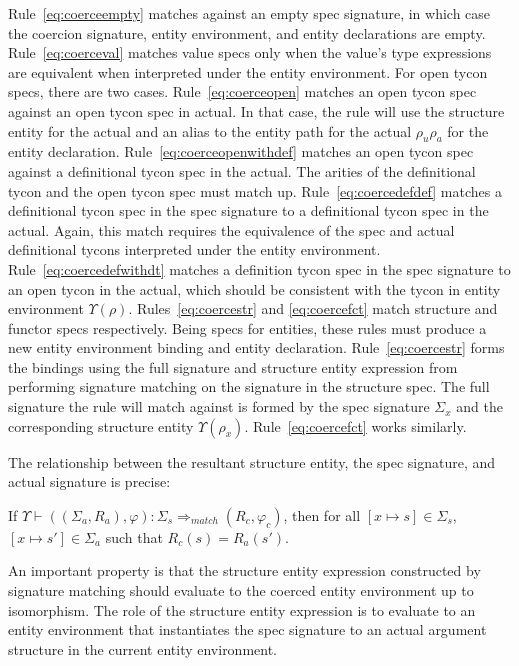 \documentclass[9pt,nocopyrightspace, fleqn]{sigplanconf}
\begin{document}
Rule~\ref{eq:coerceempty} matches against an empty spec signature, in
which case the coercion signature, entity environment, and entity
declarations are empty. Rule~\ref{eq:coerceval} matches value specs
only when the value's type expressions are equivalent when interpreted
under the entity environment. For open tycon specs, there are two
cases. Rule~\ref{eq:coerceopen} matches an open tycon spec against an
open tycon spec in actual. In that case, the rule will use the
structure entity for the actual and an alias to the entity path for
the actual $\rho_u\rho_a$ for the entity
declaration. Rule~\ref{eq:coerceopenwithdef} matches an open tycon
spec against a definitional tycon spec in the actual. The arities of
the definitional tycon and the open tycon spec must match
up. Rule~\ref{eq:coercedefdef} matches a definitional tycon spec in
the spec signature to a definitional tycon spec in the actual. Again,
this match requires the equivalence of the spec and actual
definitional tycons interpreted under the entity
environment. Rule~\ref{eq:coercedefwithdt} matches a definition tycon
spec in the spec signature to an open tycon in the actual, which should be consistent with the tycon in entity environment $\Upsilon(\rho)$. Rules~\ref{eq:coercestr} and \ref{eq:coercefct} match structure and functor specs respectively. Being specs for entities, these rules must produce a new entity environment binding and entity declaration. Rule~\ref{eq:coercestr} forms the bindings using the full signature and structure entity expression from performing signature matching on the signature in the structure spec. The full signature the rule will match against is formed by the spec signature $\Sigma_x$ and the corresponding structure entity $\Upsilon(\rho_x)$. Rule~\ref{eq:coercefct} works similarly. 

The relationship between the resultant structure entity, the spec
signature, and actual signature is precise:

\begin{lemma}
If $\Upsilon \vdash ((\Sigma_a,R_a),\varphi) : \Sigma_s \Rightarrow_{match} (R_c,
\varphi_c)$, then for all $[x\mapsto s]\in\Sigma_s$, $[x\mapsto
s']\in\Sigma_a$ such that $R_c(s)=R_a(s')$.
\end{lemma}

An important property is that the structure entity expression
constructed by signature matching should evaluate to the coerced
entity environment up to isomorphism. The role of the structure entity
expression is to evaluate to an entity environment that instantiates
the spec signature to an actual argument structure in the current
entity environment.  
\end{document}
